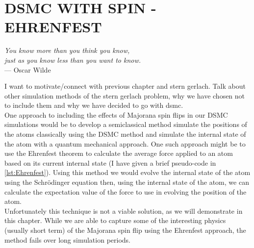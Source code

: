 
\chapter{DSMC WITH SPIN - EHRENFEST} %
\label{ch:dsmcehr} %


\begin{flushright}{\slshape    
You know more than you think you know, \\ 
just as you know less than you want to know.} \\ \medskip
--- Oscar Wilde
\end{flushright}

\bigskip

I want to motivate/connect with previous chapter and stern gerlach. Talk about other simulation methods of the stern gerlach problem, why we have chosen not to include them and why we have decided to go with dsmc.\\

One approach to including the effects of Majorana spin flips in our DSMC simulations would be to develop a semiclassical method \ie simulate the positions of the atoms classically using the DSMC method and simulate the internal state of the atom with a quantum mechanical approach.
One such approach might be to use the Ehrenfest theorem \cite{Ehrenfest1927} to calculate the average force applied to an atom based on its current internal state (I have given a brief pseudo-code in \autoref{lst:Ehrenfest}).
Using this method we would evolve the internal state of the atom using the Schr\"odinger equation then, using the internal state of the atom, we can calculate the expectation value of the force to use in evolving the position of the atom.\\

Unfortunately this technique is not a viable solution, as we will demonstrate in this chapter.
While we are able to capture some of the interesting physics (usually short term) of the Majorana spin flip using the Ehrenfest approach, the method fails over long simulation periods.



